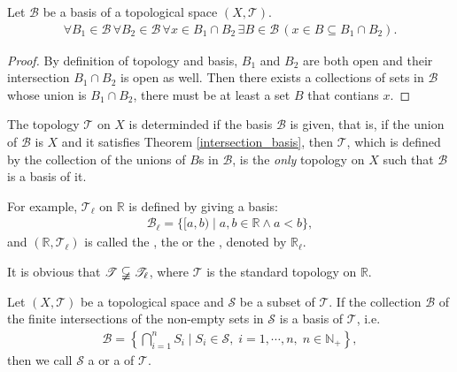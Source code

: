 \documentclass[openany]{book}
\begin{document}
\begin{theorem}\label{intersection_basis}
Let $\mathscr B$ be a basis of a topological space $(X,\mathscr T)$.
\begin{align*}
	\forall B_1\in \mathscr B\,\forall B_2\in\mathscr B\,
		\forall x\in B_1\cap B_2 \,
			\exists B\in \mathscr B\,(x\in B\subseteq B_1\cap B_2).
\end{align*}
\end{theorem}
\begin{proof}
By definition of topology and basis, 
$B_1$ and $B_2$ are both open and their intersection $B_1\cap B_2$ is open as well.
Then there exists a collections of sets in $\mathscr B$ whose union is $B_1\cap B_2$, 
there must be at least a set $B$ that contians $x$.
\end{proof}

The topology $\mathscr T$ on $X$ is determinded if the basis $\mathscr B$ is given,
that is, if the union of $\mathscr B$ is $X$ and it satisfies Theorem \ref{intersection_basis}, 
then $\mathscr T$, which is defined by the collection of the unions of $B$s in $\mathscr B$,
is the \emph{only} topology on $X$ such that $\mathscr B$ is a basis of it. 

For example,  $\mathscr T_\ell$ on $\mathbb R$ is defined by giving a basis:
\begin{align*}
	\mathscr B_\ell = \{
		[a,b)\mid a,b\in \mathbb R \wedge a<b\},
\end{align*}
and $(\mathbb R,\mathscr T_\ell)$ is called the , the  or the , denoted by $\mathbb R_\ell$.

It is obvious that $\mathscr T \varsubsetneqq\mathscr T_\ell$, where $\mathscr T$ is the standard topology on $\mathbb R$.

\begin{definition}\label{subbasis}
Let $(X,\mathscr T)$ be a topological space and $\mathscr S$ be a subset of $\mathscr T$.
If the collection $\mathscr B$ of the finite intersections of the non-empty sets in $\mathscr S$ is a basis of $\mathscr T$, i.e.\ 
\begin{align*}
	\mathscr B = \left\{
		\bigcap\limits_{i=1}^n S_i \mid
			S_i \in \mathscr S,\;i=1,\cdots,n,\;n\in\mathbb N_+\right\},
\end{align*}
then we call $\mathscr S$ a  or a  of $\mathscr T$.
\end{definition}
\end{document}
